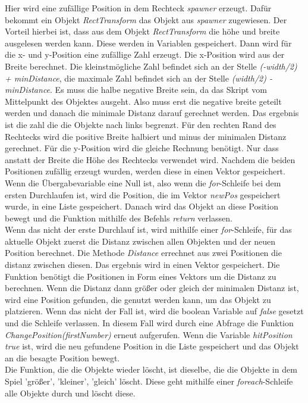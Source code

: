 Hier wird eine zufällige Position in dem Rechteck \textit{spawner} erzeugt. Dafür bekommt ein Objekt \textit{RectTransform} das Objekt aus \textit{spawner} zugewiesen. Der Vorteil hierbei ist, dass aus dem Objekt \textit{RectTransform} die höhe und breite ausgelesen werden kann. Diese werden in Variablen gespeichert. Dann wird für die x- und y-Position eine zufällige Zahl erzeugt. Die x-Position wird aus der Breite berechnet. Die kleinstmögliche  Zahl befindet sich an der Stelle \textit{(-width/2) + minDistance}, die maximale Zahl befindet sich an der Stelle \textit{(width/2) - minDistance}. Es muss die halbe negative Breite sein, da das Skript vom Mittelpunkt des Objektes ausgeht. Also muss erst die negative breite geteilt werden und danach die minimale Distanz darauf gerechnet werden. Das ergebnis ist die zahl die die Objekte nach links begrenzt. Für den rechten Rand des Rechtecks wird die positive Breite halbiert und minus der minimalen Distanz gerechnet. Für die y-Position wird die gleiche Rechnung benötigt. Nur dass anstatt der Breite die Höhe des Rechtecks verwendet wird. Nachdem die beiden Positionen zufällig erzeugt wurden, werden diese in einen Vektor gespeichert. Wenn die Übergabevariable eine Null ist, also wenn die \textit{for}-Schleife bei dem ersten Durchlaufen ist, wird die Position, die im Vektor \textit{newPos} gespeichert wurde, in eine Liste gespeichert. Danach wird das Objekt an diese Position bewegt und die Funktion mithilfe des Befehls \textit{return} verlassen.\\
Wenn das nicht der erste Durchlauf ist, wird mithilfe einer \textit{for}-Schleife, für das aktuelle Objekt zuerst die Distanz zwischen allen Objekten und der neuen Position berechnet.
Die Methode \textit{Distance} errechnet aus zwei Positionen die distanz zwischen diesen. Das ergebnis wird in einen Vektor gespeichert. Die Funktion benötigt die Positionen in Form eines Vektors um die Distanz zu berechnen. Wenn die Distanz dann größer oder gleich der minimalen Distanz ist, wird eine Position gefunden, die genutzt werden kann, um das Objekt zu platzieren. Wenn das nicht der Fall ist, wird die boolean Variable auf \textit{false} gesetzt und die Schleife verlassen. In diesem Fall wird durch eine Abfrage die Funktion \textit{ChangePosition(firstNumber)} erneut aufgerufen. Wenn die Variable \textit{hitPosition} \textit{true} ist, wird die neu gefundene Position in die Liste gespeichert und das Objekt an die besagte Position bewegt.\\
Die Funktion, die die Objekte wieder löscht, ist dieselbe, die die Objekte in dem Spiel 'größer', 'kleiner', 'gleich' löscht. Diese geht mithilfe einer \textit{foreach}-Schleife alle Objekte durch und löscht diese.\\
